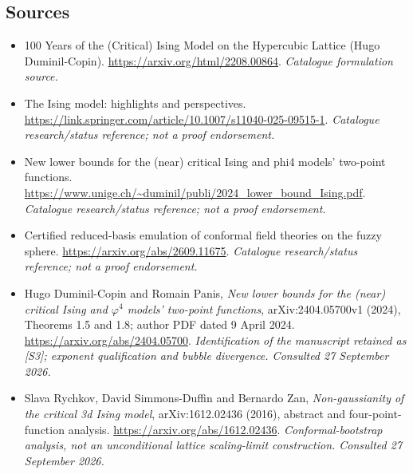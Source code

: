\documentclass[11pt,a4paper]{article}
\numberwithin{equation}{section}
\begin{document}
\subsection{Sources}
\begin{itemize}\raggedright
\item[\textnormal{[S1]}]\hypertarget{source:42:1}{} 100 Years of the (Critical) Ising Model on the Hypercubic Lattice (Hugo Duminil-Copin).
\url{https://arxiv.org/html/2208.00864}.
{\small\textit{Catalogue formulation source.}}
\item[\textnormal{[S2]}]\hypertarget{source:42:2}{} The Ising model: highlights and perspectives.
\url{https://link.springer.com/article/10.1007/s11040-025-09515-1}.
{\small\textit{Catalogue research/status reference; not a proof endorsement.}}
\item[\textnormal{[S3]}]\hypertarget{source:42:3}{} New lower bounds for the (near) critical Ising and phi4 models' two-point functions.
\url{https://www.unige.ch/~duminil/publi/2024_lower_bound_Ising.pdf}.
{\small\textit{Catalogue research/status reference; not a proof endorsement.}}
\item[\textnormal{[S4]}]\hypertarget{source:42:4}{} Certified reduced-basis emulation of conformal field theories on the fuzzy sphere.
\url{https://arxiv.org/abs/2609.11675}.
{\small\textit{Catalogue research/status reference; not a proof endorsement.}}
\item[\textnormal{[E1]}]\hypertarget{extra:42:1}{} Hugo Duminil-Copin and Romain Panis,
\emph{New lower bounds for the (near) critical Ising and $\varphi^4$ models' two-point functions},
arXiv:2404.05700v1 (2024), Theorems 1.5 and 1.8; author PDF dated 9 April 2024.
\url{https://arxiv.org/abs/2404.05700}.
{\small\textit{Identification of the manuscript retained as [S3]; exponent qualification and bubble divergence. Consulted 27 September 2026.}}
\item[\textnormal{[E2]}]\hypertarget{extra:42:2}{} Slava Rychkov, David Simmons-Duffin and Bernardo Zan,
\emph{Non-gaussianity of the critical 3d Ising model}, arXiv:1612.02436 (2016), abstract and four-point-function analysis.
\url{https://arxiv.org/abs/1612.02436}.
{\small\textit{Conformal-bootstrap analysis, not an unconditional lattice scaling-limit construction. Consulted 27 September 2026.}}
\end{itemize}
\end{document}
